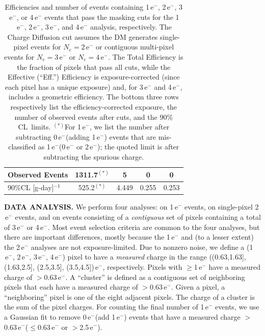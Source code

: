 \documentclass[aps,prl,twocolumn,showpacs,superscriptaddress,preprintnumbers]{revtex4-1}
\newcommand{\unit}[1]{\ensuremath{\mathrm{\,#1}}\xspace}
\newcommand{\e}{\unit{e^{-}}}
\begin{document}
\begin{table}[t!]
\begin{center}
\begin{footnotesize}
\begin{tabular}{|l||*{8}{c|}}
Observed Events            & \multicolumn{2}{c|}{1311.7$^{(*)}$}      & \multicolumn{2}{c|}{5}     & \multicolumn{2}{c|}{0}      & \multicolumn{2}{c|}{0}      \\ \hline
90\%CL [g-day]$^{-1}$ & \multicolumn{2}{c|}{525.2$^{(*)}$} & \multicolumn{2}{c|}{4.449} %
                                    & \multicolumn{2}{c|}{0.255} & \multicolumn{2}{c|}{0.253}      \\ \hline
\end{tabular}
\end{footnotesize}
\caption{Efficiencies and number of events containing 1\e, 2\e, 3\e, or 4\e events that pass the masking cuts for the 1\e, 2\e, 3\e, and 4\e analysis, respectively. 
The Charge Diffusion cut assumes the DM generates single-pixel events for $N_e=2\e$ or contiguous multi-pixel events for $N_e=3\e$ or $N_e=4\e$. 
The Total Efficiency is the fraction of pixels that pass all cuts, while the Effective (``Eff.'') Efficiency is exposure-corrected (since each pixel has a unique exposure) and, for 3\e and 4\e, includes a geometric efficiency.  The bottom three rows respectively list the efficiency-corrected exposure, the number of observed events after cuts, and the 90\% CL~limits.  $^{(*)}$For 1\e, we list the number after subtracting 0\e (adding 1\e) events that are mis-classified as 1\e (0\e or 2\e); the quoted limit is after subtracting the spurious charge. 
} 
\label{tab:eff}
\end{center}
\end{table}%
\noindent\textbf{DATA ANALYSIS.}
We perform four analyses: on 1\e events, on single-pixel 2\e events, and on events consisting of a \textit{contiguous} set of pixels containing a total of 3\e or 4\e. Most event selection criteria are common to the four analyses, but there are important differences, mostly because the 1\e and (to a lesser extent) the 2\e analyses are not exposure-limited. Due to nonzero noise, we define a (1\e, 2\e, 3\e, 4\e) pixel to have a \textit{measured} charge in the range ((0.63,1.63], (1.63,2.5], (2.5,3.5], (3.5,4.5])\e, respectively. Pixels with $\ge$1\e have a measured charge of $>$0.63\e.  A ``cluster'' is defined as a contiguous set of neighboring pixels that each have a measured charge of $>$0.63\e. Given a pixel, a ``neighboring'' pixel is one of the eight adjacent pixels. 
The charge of a cluster is the sum of the pixel charges.  For counting the final number of 1\e events, we use a Gaussian fit to remove 0\e (add 1\e) events that have a measured charge $>$0.63\e ($\le$0.63\e or $>$2.5\e). 
\end{document}
